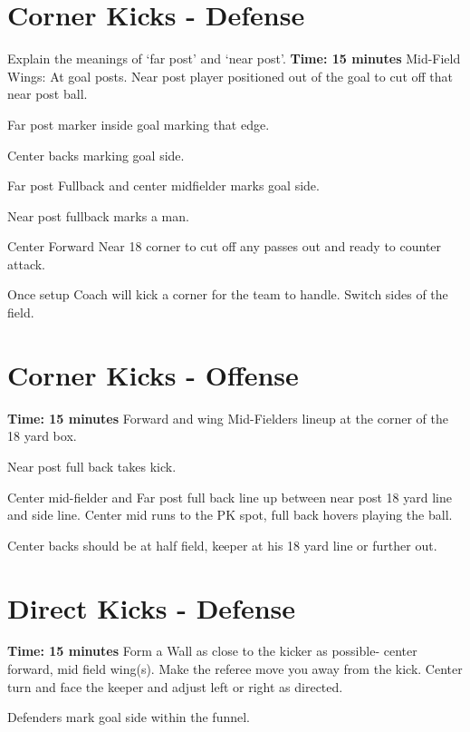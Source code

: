 \documentclass[10pt,letterpaper]{article}
\newenvironment{evenBlock}[1]{%
    \tcolorbox[beamer,%
    noparskip,breakable,
    colback=LightGreen,colframe=DarkGreen,%
    colbacklower=LimeGreen!75!LightGreen,%
    title=#1]}%
    {\endtcolorbox}
\begin{document}
\section{Corner Kicks - Defense}
Explain the meanings of `far post' and `near post'.
\textbf{Time: 15 minutes}
\begin{evenBlock}{Positions}
    Mid-Field Wings: At goal posts.  Near post player positioned out of the goal to cut off that near post ball.

    Far post marker inside goal marking that edge.

    Center backs marking goal side.

    Far post Fullback and center midfielder marks goal side.

    Near post fullback marks a man.

    Center Forward Near 18 corner to cut off any passes out and ready to counter attack.
\end{evenBlock}

Once setup Coach will kick a corner for the team to handle.  Switch sides of the field.

\section{Corner Kicks - Offense}
\textbf{Time: 15 minutes}
\begin{evenBlock}{Positions}
    Forward and wing Mid-Fielders lineup at the corner of the 18 yard box.

    Near post full back takes kick.

    Center mid-fielder and Far post full back line up between near post 18 yard line and side line. Center mid runs to the PK spot, full back hovers playing the ball.

    Center backs should be at half field, keeper at his 18 yard line or further out.
    
\end{evenBlock}

\clearpage

\section{Direct Kicks - Defense}
\textbf{Time: 15 minutes}
\begin{evenBlock}{Positions}
    Form a Wall as close to the kicker as possible- center forward, mid field wing(s).  Make the referee move you away from the kick.  Center turn and face the keeper and adjust left or right as directed.   

    Defenders mark goal side within the funnel.
\end{evenBlock}
\end{document}
